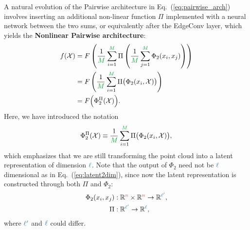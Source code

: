 \documentclass[aps,prd,twocolumn,superscriptaddress,floatfix,longbibliography,preprintnumbers,nofootinbib]{revtex4-1} %
\DeclareRobustCommand{\Eq}[1]{Eq.~(\ref{eq:#1})}
\begin{document}
      
      A natural evolution of the Pairwise architecture in \Eq{pairwise_arch} involves inserting an additional non-linear function $\Pi$ implemented with a neural network between the two sums, or equivalently after the EdgeConv layer, which  yields the \textbf{Nonlinear Pairwise architecture}:
       \begin{align}
        \nonumber
        f(\mathcal X) & = F \left( \frac{1}{{\color{c2}M}}\sum_{i=1}^{{\color{c2} M}} \Pi\left( \frac{1}{{\color{c2} M}}\sum_{j=1}^{{\color{c2} M}}\Phi_2(x_i, x_j) \right)  \right)\\
        \nonumber & = F \left( \frac{1}{{\color{c2}M}}\sum_{i=1}^{{\color{c2} M}} \Pi \big( \Phi_2(x_i,\mathcal X)\big) \right) \\
         &= F \Big(\Phi_2^\Pi(\mathcal X)  \Big).
        \label{eq:edgeconvnl}
      \end{align}
      Here, we have introduced the notation
      \begin{equation}
          \Phi_2^\Pi(\mathcal X) \equiv \frac{1}{{\color{c2}M}}\sum_{i=1}^{{\color{c2}M}} \Pi \big( \Phi_2(x_i,\mathcal X) \big) ,
          \label{eq:phipi}
        \end{equation}
      which emphasizes that we are still transforming the point cloud into a latent representation of dimension ${\color{c3}\ell}$.
      Note that the output of $\Phi_2$ need not be ${{\color{c3}\ell}}$ dimensional as in \Eq{latent2dim}, since now the latent representation is constructed through both \(\Pi\) and \(\Phi_2\):
%
     \begin{align}
       \Phi_2(x_i, x_j)&:  \mathbb R^{{\color{c1}n}}\times \mathbb R^{{\color{c1}n}} \to \mathbb R^{{\color{c3}\ell'}}, \\
       \Pi &:  \mathbb R^{{\color{c3}\ell'}} \to \mathbb R^{{\color{c3}\ell}},
      \end{align}
      where ${{\color{c3}\ell'}}$ and ${{\color{c3}\ell}}$ could differ. 
           
\end{document}
